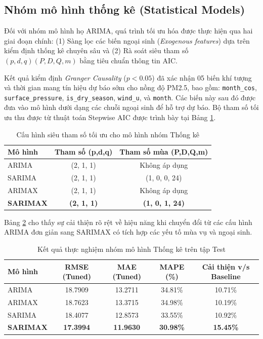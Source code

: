 \subsection{Nhóm mô hình thống kê (Statistical Models)}

Đối với nhóm mô hình họ ARIMA, quá trình tối ưu hóa được thực hiện qua hai giai đoạn chính: (1) Sàng lọc các biến ngoại sinh (\textit{Exogenous features}) dựa trên kiểm định thống kê chuyên sâu và (2) Rà soát siêu tham số $(p,d,q)(P,D,Q,m)$ bằng tiêu chuẩn thông tin AIC.

Kết quả kiểm định \textit{Granger Causality} ($p < 0.05$) đã xác nhận 05 biến khí tượng và thời gian mang tín hiệu dự báo sớm cho nồng độ PM2.5, bao gồm: \texttt{month\_cos}, \texttt{surface\_pressure}, \texttt{is\_dry\_season}, \texttt{wind\_u}, và \texttt{month}. Các biến này sau đó được đưa vào mô hình dưới dạng các chuỗi ngoại sinh để hỗ trợ dự báo. Bộ tham số tối ưu thu được từ thuật toán Stepwise AIC được trình bày tại Bảng \ref{tab:stats_best_params}.

\begin{table}[H]
    \centering
    \caption{Cấu hình siêu tham số tối ưu cho mô hình nhóm Thống kê}
    \label{tab:stats_best_params}
    \begin{tabular}{|l|c|c|}
    \hline
    \textbf{Mô hình} & \textbf{Tham số (p,d,q)} & \textbf{Tham số mùa (P,D,Q,m)} \\ \hline
    ARIMA      & (2, 1, 1) & Không áp dụng \\ \hline
    SARIMA     & (2, 1, 1) & (1, 0, 0, 24) \\ \hline
    ARIMAX     & (2, 1, 1) & Không áp dụng \\ \hline
    \textbf{SARIMAX} & \textbf{(2, 1, 1)} & \textbf{(1, 0, 1, 24)} \\ \hline
    \end{tabular}
\end{table}

Bảng \ref{tab:stats_improvement} cho thấy sự cải thiện rõ rệt về hiệu năng khi chuyển đổi từ các cấu hình ARIMA đơn giản sang SARIMAX có tích hợp các yếu tố mùa vụ và ngoại sinh.

\begin{table}[H]
    \centering
    \caption{Kết quả thực nghiệm nhóm mô hình Thống kê trên tập Test}
    \label{tab:stats_improvement}
    \begin{tabular}{|l|c|c|c|c|}
    \hline
    \textbf{Mô hình} & \textbf{RMSE (Tuned)} & \textbf{MAE (Tuned)} & \textbf{MAPE (\%)} & \textbf{Cải thiện v/s Baseline} \\ \hline
    ARIMA            & 18.7909               & 13.2711              & 34.81\%            & 10.71\% \\
    ARIMAX           & 18.7623               & 13.3715              & 34.98\%            & 10.19\% \\
    SARIMA           & 18.4077               & 12.8573              & 33.55\%            & 10.92\% \\
    \textbf{SARIMAX} & \textbf{17.3994}      & \textbf{11.9630}     & \textbf{30.98\%}   & \textbf{15.45\%} \\ \hline
    \end{tabular}
\end{table}

